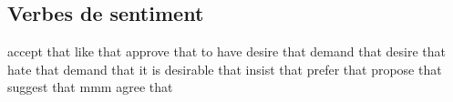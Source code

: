 \subsection*{Verbes de sentiment}
   {accept that}
   {like that}
   {approve that}
   {to have desire that}
   {demand that}
   {desire that}
   {hate that}
   {demand that}
   {it is desirable that}
   {insist that}
   {prefer that}
   {propose that}
   {suggest that}
   {mmm}
   {agree that}

